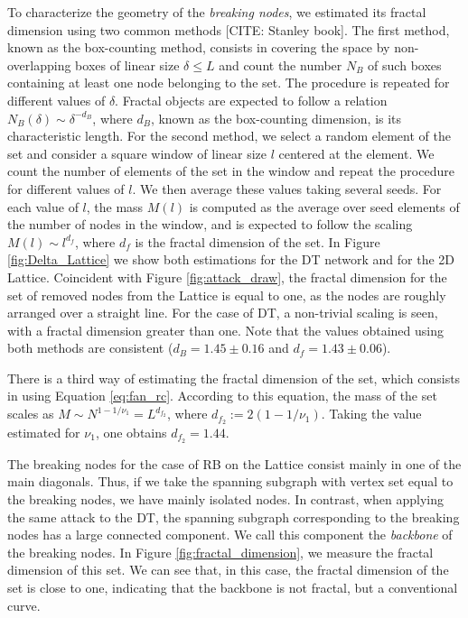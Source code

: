 \documentclass{article}
\begin{document}
To characterize the geometry of the \emph{breaking nodes}, we estimated its fractal dimension using two common methods [CITE: Stanley book]. The first method, known as the box-counting method, consists in covering the space by non-overlapping boxes of linear size $\delta \leq L$ and count the number $N_B$  of such boxes containing at least one node belonging to the set. The procedure is repeated for different values of $\delta$. Fractal objects are expected to follow a relation $N_B(\delta) \sim \delta^{-d_B}$, where $d_B$, known as the box-counting dimension, is its characteristic length. For the second method, we select a random element of the set and consider a square window of linear size $l$ centered at the element. We count the number of elements of the set in the window and repeat the procedure for different values of $l$. We then average these values taking several seeds. For each value of $l$, the mass $M(l)$ is computed as the average over seed elements of the number of nodes in the window, and is expected to follow the scaling $M(l)\sim l^{d_f}$, where $d_f$ is the fractal dimension of the set. In Figure \ref{fig:Delta_Lattice} we show both estimations for the DT network and for the 2D Lattice. Coincident with Figure \ref{fig:attack_draw}, the fractal dimension for the set of removed nodes from the Lattice is equal to one, as the nodes are roughly arranged over a straight line. For the case of DT, a non-trivial scaling is seen, with a fractal dimension greater than one. Note that the values obtained using both methods are consistent ($d_B = 1.45\pm 0.16$ and $d_f = 1.43\pm 0.06$).

There is a third way of estimating the fractal dimension of the set, which consists in using Equation \ref{eq:fan_rc}. According to this equation, the mass of the set scales as $M\sim N^{1-1/\nu_1} = L^{d_{f_2}}$, where $d_{f_2} := 2(1-1/\nu_1)$. Taking the value estimated for $\nu_1$, one obtains $d_{f_2} = 1.44$.

The breaking nodes for the case of RB on the Lattice consist mainly in one of the main diagonals. Thus, if we take the spanning subgraph with vertex set equal to the breaking nodes, we have mainly isolated nodes. In contrast, when applying the same attack to the DT, the spanning subgraph corresponding to the breaking nodes has a large connected component. We call this component the \emph{backbone} of the breaking nodes. In Figure \ref{fig:fractal_dimension}, we measure the fractal dimension of this set. We can see that, in this case, the fractal dimension of the set is close to one, indicating that the backbone is not fractal, but a conventional curve. 
\end{document}
